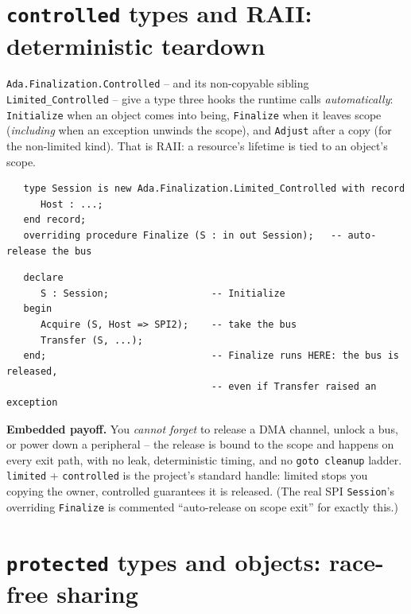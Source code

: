 \section{\texttt{controlled} types and RAII: deterministic teardown}

\texttt{Ada.Finalization.Controlled} -- and its non-copyable sibling
\texttt{Limited\_Controlled} -- give a type three hooks the runtime calls
\emph{automatically}: \texttt{Initialize} when an object comes into being,
\texttt{Finalize} when it leaves scope (\emph{including} when an exception unwinds
the scope), and \texttt{Adjust} after a copy (for the non-limited kind). That is
RAII: a resource's lifetime is tied to an object's scope.

\begin{lstlisting}
   type Session is new Ada.Finalization.Limited_Controlled with record
      Host : ...;
   end record;
   overriding procedure Finalize (S : in out Session);   -- auto-release the bus
\end{lstlisting}

\begin{lstlisting}
   declare
      S : Session;                  -- Initialize
   begin
      Acquire (S, Host => SPI2);    -- take the bus
      Transfer (S, ...);
   end;                             -- Finalize runs HERE: the bus is released,
                                    -- even if Transfer raised an exception
\end{lstlisting}

\textbf{Embedded payoff.} You \emph{cannot forget} to release a DMA channel,
unlock a bus, or power down a peripheral -- the release is bound to the scope and
happens on every exit path, with no leak, deterministic timing, and no
\texttt{goto cleanup} ladder. \texttt{limited} + \texttt{controlled} is the
project's standard handle: limited stops you copying the owner, controlled
guarantees it is released. (The real SPI \texttt{Session}'s overriding
\texttt{Finalize} is commented ``auto-release on scope exit'' for exactly this.)


\section{\texttt{protected} types and objects: race-free sharing}

